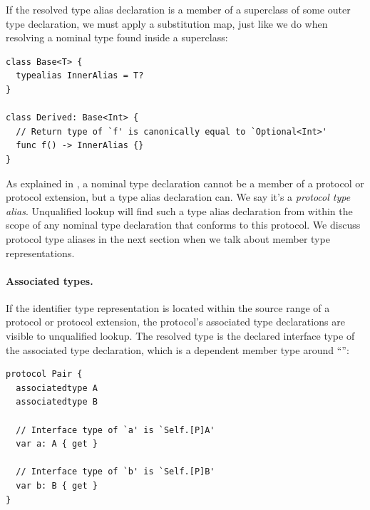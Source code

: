 \documentclass[../generics]{subfiles}
\begin{document}
If the resolved type alias declaration is a member of a superclass of some outer type declaration, we must apply a substitution map, just like we do when resolving a nominal type found inside a superclass:
\begin{Verbatim}
class Base<T> {
  typealias InnerAlias = T?
}

class Derived: Base<Int> {
  // Return type of `f' is canonically equal to `Optional<Int>'
  func f() -> InnerAlias {}
}
\end{Verbatim}

As explained in , a nominal type declaration cannot be a member of a protocol or protocol extension, but a type alias declaration can. We say it's a \emph{protocol type alias}. Unqualified lookup will find such a type alias declaration from within the scope of any nominal type declaration that conforms to this protocol. We discuss protocol type aliases in the next section when we talk about member type representations.

\paragraph{Associated types.}
If the identifier type representation is located within the source range of a protocol or protocol extension, the protocol's associated type declarations are visible to unqualified lookup. The resolved type is the declared interface type of the associated type declaration, which is a dependent member type around ``\tSelf'':
\begin{Verbatim}
protocol Pair {
  associatedtype A
  associatedtype B

  // Interface type of `a' is `Self.[P]A'
  var a: A { get }

  // Interface type of `b' is `Self.[P]B'
  var b: B { get }
}
\end{Verbatim}
\end{document}
